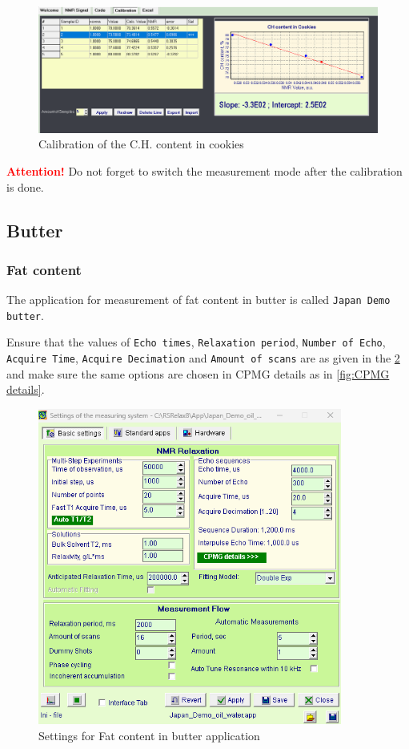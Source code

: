 \documentclass[a4paper,12pt]{article}
\begin{document}
\begin{figure}[H]
\centering
\includegraphics[width=17cm]{Calibration_Cookies_CH.png}
\caption{Calibration of the C.H. content in cookies}
\label{fig:Calibration CH content in cookies}
\end{figure}

\textcolor{red}{\textbf{Attention!}} Do not forget to switch the measurement mode after the calibration is done.

\newpage
\subsection{Butter}
\subsubsection{Fat content}


The application for measurement of fat content in butter is called
\texttt{Japan Demo butter}.


Ensure that the values of \texttt{Echo times}, \texttt{Relaxation period}, \texttt{Number of Echo}, \texttt{Acquire Time}, \texttt{Acquire Decimation} and \texttt{Amount of scans} are as given in the \cref{fig:Settings for CPMG} and 
make sure the same options are chosen in CPMG details as in \cref{fig:CPMG details}.

\begin{figure}[H]
\centering
\includegraphics[width=10cm]{Settings_OilWater.png}
\caption{Settings for Fat content in butter application}
\label{fig:Settings for CPMG}
\end{figure}
\end{document}
